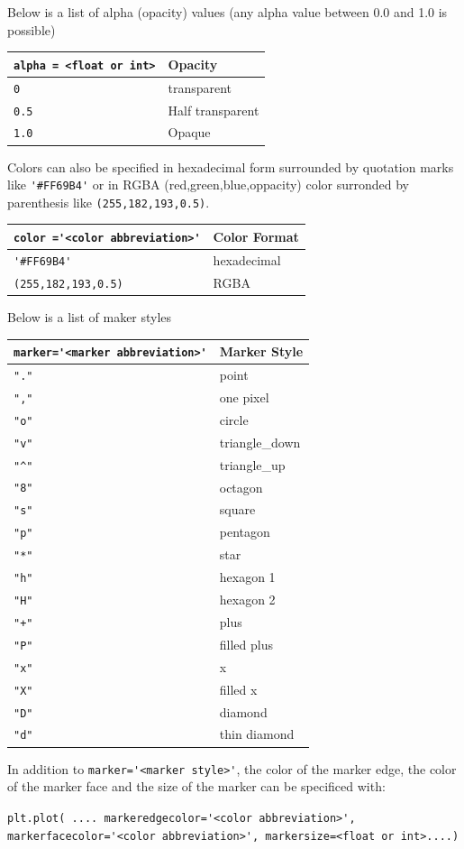 \documentclass{book}
\begin{document}
Below is a list of alpha (opacity) values (any alpha value between 0.0
and 1.0 is possible)

\begin{longtable}[]{@{}ll@{}}
\toprule
\lstinline!alpha = <float or int>! & Opacity\tabularnewline
\midrule
\endhead
\lstinline!0! & transparent\tabularnewline
\lstinline!0.5! & Half transparent\tabularnewline
\lstinline!1.0! & Opaque\tabularnewline
\bottomrule
\end{longtable}

Colors can also be specified in hexadecimal form surrounded by quotation
marks like \lstinline!'#FF69B4'! or in RGBA (red,green,blue,oppacity)
color surronded by parenthesis like \lstinline!(255,182,193,0.5)!.

\begin{longtable}[]{@{}ll@{}}
\toprule
\lstinline!color ='<color abbreviation>'! & Color Format\tabularnewline
\midrule
\endhead
\lstinline!'#FF69B4'! & hexadecimal\tabularnewline
\lstinline!(255,182,193,0.5)! & RGBA\tabularnewline
\bottomrule
\end{longtable}

Below is a list of maker styles

\begin{longtable}[]{@{}ll@{}}
\toprule
\lstinline!marker='<marker abbreviation>'! & Marker Style\tabularnewline
\midrule
\endhead
\lstinline!"."! & point\tabularnewline
\lstinline!","! & one pixel\tabularnewline
\lstinline!"o"! & circle\tabularnewline
\lstinline!"v"! & triangle\_down\tabularnewline
\lstinline!"^"! & triangle\_up\tabularnewline
\lstinline!"8"! & octagon\tabularnewline
\lstinline!"s"! & square\tabularnewline
\lstinline!"p"! & pentagon\tabularnewline
\lstinline!"*"! & star\tabularnewline
\lstinline!"h"! & hexagon 1\tabularnewline
\lstinline!"H"! & hexagon 2\tabularnewline
\lstinline!"+"! & plus\tabularnewline
\lstinline!"P"! & filled plus\tabularnewline
\lstinline!"x"! & x\tabularnewline
\lstinline!"X"! & filled x\tabularnewline
\lstinline!"D"! & diamond\tabularnewline
\lstinline!"d"! & thin diamond\tabularnewline
\bottomrule
\end{longtable}

In addition to \lstinline!marker='<marker style>'!, the color of the
marker edge, the color of the marker face and the size of the marker can
be specificed with:

\lstinline!plt.plot( .... markeredgecolor='<color abbreviation>', markerfacecolor='<color abbreviation>', markersize=<float or int>....)!
    
\end{document}
